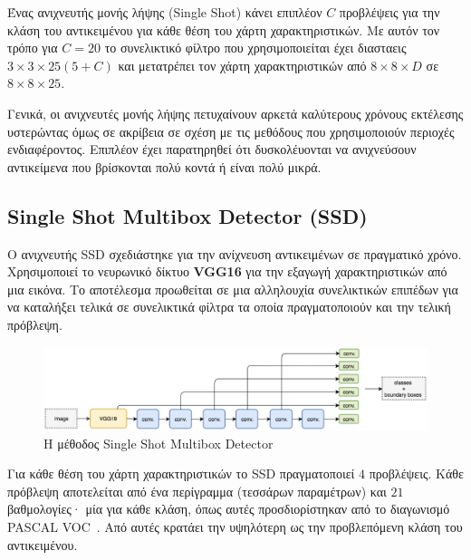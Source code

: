 Ένας ανιχνευτής μονής λήψης (Single Shot) κάνει επιπλέον $C$ προβλέψεις για την
κλάση του αντικειμένου για κάθε θέση του χάρτη χαρακτηριστικών. Με αυτόν τον τρόπο
για $C = 20$ το συνελικτικό φίλτρο που χρησιμοποιείται έχει διασταεις
$ 3 \times 3 \times 25(5 + C)$ και μετατρέπει τον χάρτη χαρακτηριστικών από $8 \times 8 \times D$
σε $8 \times 8 \times 25$.

Γενικά, οι ανιχνευτές μονής λήψης πετυχαίνουν αρκετά καλύτερους χρόνους εκτέλεσης
υστερώντας όμως σε ακρίβεια σε σχέση με τις μεθόδους που χρησιμοποιούν περιοχές ενδιαφέροντος.
Επιπλέον έχει παρατηρηθεί ότι δυσκολέυονται να ανιχνεύσουν αντικείμενα που βρίσκονται
πολύ κοντά ή είναι πολύ μικρά.

\subsection{Single Shot Multibox Detector (SSD)}\label{sec:ssd}

Ο ανιχνευτής SSD σχεδιάστηκε για την ανίχνευση αντικειμένων σε πραγματικό χρόνο.
Χρησιμοποιεί το νευρωνικό δίκτυο \textbf{VGG16} για την εξαγωγή χαρακτηριστικών
από μια εικόνα. Το αποτέλεσμα προωθείται σε μια αλληλουχία συνελικτικών επιπέδων
για να καταλήξει τελικά σε συνελικτικά φίλτρα τα οποία πραγματοποιούν και την
τελική πρόβλεψη.

\begin{figure}[htbp]
  \begin{center}
    \includegraphics[width=0.9\maxwidth]{../figures/ssd.png}
    \caption{Η μέθοδος Single Shot Multibox Detector\label{fig:ssd}}
   \end{center}
\end{figure}

Για κάθε θέση του χάρτη χαρακτηριστικών το SSD πραγματοποιεί $4$ προβλέψεις. Κάθε
πρόβλεψη αποτελείται από ένα περίγραμμα (τεσσάρων παραμέτρων) και $21$  βαθμολογίες·
μία για κάθε κλάση, όπως αυτές προσδιορίστηκαν από το διαγωνισμό PASCAL VOC~\cite{pascal-voc-2007}.
Από αυτές κρατάει την υψηλότερη ως την προβλεπόμενη κλάση του αντικειμένου.

